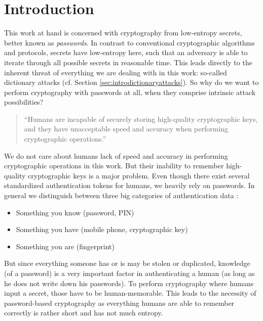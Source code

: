 \chapter{Introduction}\label{ch:introduction}

This work at hand is concerned with cryptography from low-entropy secrets, better known as \emph{passwords}.
In contrast to conventional cryptographic algorithms and protocols, secrets have low-entropy here, such that an adversary is able to iterate through all possible secrets in reasonable time.
This leads directly to the inherent threat of everything we are dealing with in this work: so-called dictionary attacks (cf. Section \ref{sec:introdictionaryattacks}).
So why do we want to perform cryptography with passwords at all, when they comprise intrinsic attack possibilities?

\begin{quote}
``Humans are incapable of securely storing high-quality cryptographic keys, and they have unacceptable speed and accuracy when performing cryptographic operations.''~\cite{Kaufmann02}
\end{quote}

\noindent
We do not care about humans lack of speed and accuracy in performing cryptographic operations in this work.
But their inability to remember high-quality cryptographic keys is a major problem.
Even though there exist several standardized authentication tokens for humans, we heavily rely on passwords.
In general we distinguish between three big categories of authentication data \cite{Burr11}:
\begin{itemize}
	\item Something you know (\eg password, \ac{PIN})
	\item Something you have (\eg mobile phone, cryptographic key)
	\item Something you are (\eg fingerprint)
\end{itemize}
But since everything someone has or is may be stolen or duplicated, knowledge (of a password) is a very important factor in authenticating a human (as long as he does not write down his passwords).
To perform cryptography where humans input a secret, those have to be human-memorable.
This leads to the necessity of password-based cryptography as everything humans are able to remember correctly is rather short and has not much entropy.

